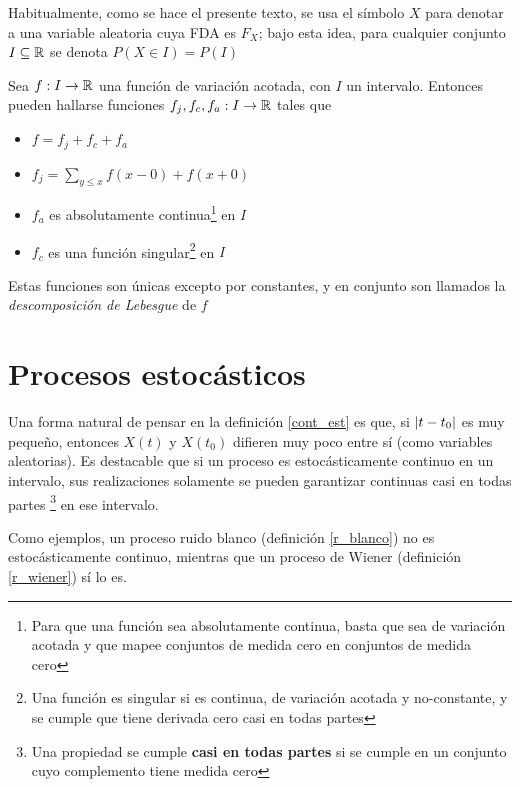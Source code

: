 Habitualmente, como se hace el presente texto, se usa el símbolo $X$ para denotar a una variable 
aleatoria cuya FDA es $F_X$; bajo esta idea, para cualquier conjunto $I \subseteq \mathbb{R}$ se denota
$P(X \in I) = P(I)$



\begin{teorema}
Sea $f:I\rightarrow \mathbb{R}$ una funci\'on de variaci\'on acotada, con $I$ un intervalo. Entonces pueden 
hallarse funciones $f_j, f_c, f_a :I\rightarrow \mathbb{R}$ tales que
\begin{itemize}
\item $f = f_j+ f_c+ f_a$
\item $f_j = \sum_{y \leq x} f(x-0) + f(x+0)$
\item $f_a$ es absolutamente continua\footnote{Para que una funci\'on sea absolutamente continua,
basta que sea de variaci\'on acotada y que mapee conjuntos de medida cero en conjuntos de medida
cero} en $I$
\item $f_c$ es una funci\'on singular\footnote{Una funci\'on es singular si es continua, de 
variaci\'on acotada y no-constante, y se cumple que tiene derivada cero casi en todas partes} en 
$I$
\end{itemize}
Estas funciones son \'unicas excepto por constantes, y en conjunto son llamados la 
\textit{descomposici\'on de Lebesgue} de $f$
\label{Lebesgue_decomp}
\end{teorema}


\section{Procesos estocásticos}

Una forma natural de pensar en la definici\'on \ref{cont_est} es que, si $\left| t-t_0 \right|$ es muy 
peque\~no, entonces $X(t)$ y $X(t_0)$ difieren muy poco entre s\'i (como variables aleatorias).
Es destacable que si un proceso es estoc\'asticamente continuo en un intervalo, sus realizaciones 
solamente se pueden garantizar continuas casi en todas partes \footnote{Una propiedad se cumple 
\textbf{casi en todas partes} si se cumple en un conjunto cuyo complemento tiene medida cero} en 
ese intervalo.

Como ejemplos, un proceso ruido blanco (definici\'on \ref{r_blanco}) no es estoc\'asticamente 
continuo, mientras que un proceso de Wiener (definici\'on \ref{r_wiener}) s\'i lo es.

